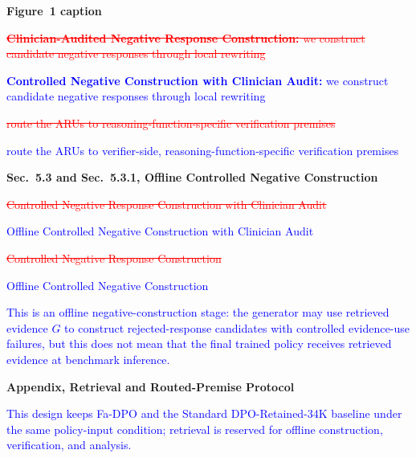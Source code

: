 \documentclass[12pt]{article}
\newcommand{\deleted}[1]{\textcolor{red}{\sout{#1}}}
\newcommand{\added}[1]{\textcolor{blue}{#1}}
\begin{document}
\noindent\textbf{Figure~1 caption}
\begin{displayquote}
\deleted{\textbf{Clinician-Audited Negative Response Construction:} we construct candidate negative responses through local rewriting}

\added{\textbf{Controlled Negative Construction with Clinician Audit:} we construct candidate negative responses through local rewriting}

\deleted{route the ARUs to reasoning-function-specific verification premises}

\added{route the ARUs to verifier-side, reasoning-function-specific verification premises}
\end{displayquote}

\noindent\textbf{Sec.~5.3 and Sec.~5.3.1, Offline Controlled Negative Construction}
\begin{displayquote}
\deleted{Controlled Negative Response Construction with Clinician Audit}

\added{Offline Controlled Negative Construction with Clinician Audit}

\deleted{Controlled Negative Response Construction}

\added{Offline Controlled Negative Construction}

\added{This is an offline negative-construction stage: the generator may use retrieved evidence $G$ to construct rejected-response candidates with controlled evidence-use failures, but this does not mean that the final trained policy receives retrieved evidence at benchmark inference.}
\end{displayquote}

\noindent\textbf{Appendix, Retrieval and Routed-Premise Protocol}
\begin{displayquote}
\added{This design keeps Fa-DPO and the Standard DPO-Retained-34K baseline under the same policy-input condition; retrieval is reserved for offline construction, verification, and analysis.}
\end{displayquote}
\end{document}

